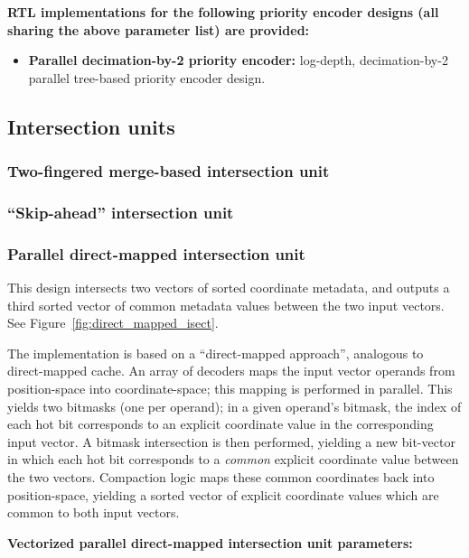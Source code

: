 \textbf{RTL implementations for the following priority encoder designs (all sharing the above parameter list) are provided:}

\begin{itemize}
    \item \textbf{Parallel decimation-by-2 priority encoder:} log-depth, decimation-by-2 parallel tree-based priority encoder design.
\end{itemize}

\subsection{Intersection units}

\subsubsection{Two-fingered merge-based intersection unit}

\subsubsection{``Skip-ahead'' intersection unit}

\subsubsection{Parallel direct-mapped intersection unit}

This design intersects two vectors of sorted coordinate metadata, and outputs a third sorted vector of common metadata values between the two input vectors. See Figure~\ref{fig:direct_mapped_isect}.

The implementation is based on a ``direct-mapped approach'', analogous to direct-mapped cache. An array of decoders maps the input vector operands from position-space into coordinate-space; this mapping is performed in parallel. This yields two bitmasks (one per operand); in a given operand's bitmask, the index of each hot bit corresponds to an explicit coordinate value in the corresponding input vector. A bitmask intersection is then performed, yielding a new bit-vector in which each hot bit corresponds to a \textit{common} explicit coordinate value between the two vectors. Compaction logic maps these common coordinates back into position-space, yielding a sorted vector of explicit coordinate values which are common to both input vectors.

\textbf{Vectorized parallel direct-mapped intersection unit parameters:}


